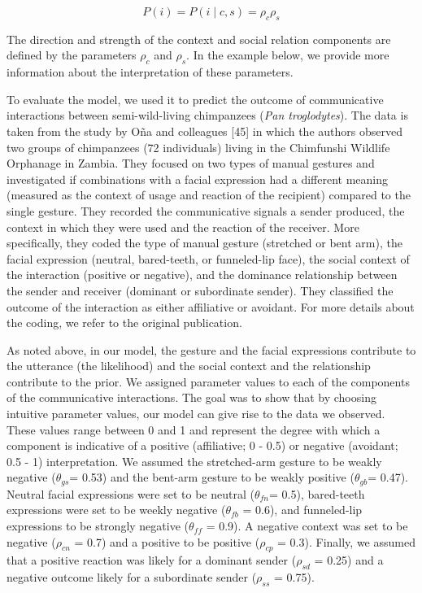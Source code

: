 \documentclass[
  english,
  man,floatsintext]{apa6}
\begin{document}
\begin{equation}
P(i)=P(i \mid c,s) = \rho_c \rho_s
\end{equation}

The direction and strength of the context and social relation components are defined by the parameters \(\rho_c\) and \(\rho_s\). In the example below, we provide more information about the interpretation of these parameters.

To evaluate the model, we used it to predict the outcome of communicative interactions between semi-wild-living chimpanzees (\emph{Pan troglodytes}). The data is taken from the study by Oña and colleagues {[}45{]} in which the authors observed two groups of chimpanzees (72 individuals) living in the Chimfunshi Wildlife Orphanage in Zambia. They focused on two types of manual gestures and investigated if combinations with a facial expression had a different meaning (measured as the context of usage and reaction of the recipient) compared to the single gesture. They recorded the communicative signals a sender produced, the context in which they were used and the reaction of the receiver. More specifically, they coded the type of manual gesture (stretched or bent arm), the facial expression (neutral, bared-teeth, or funneled-lip face), the social context of the interaction (positive or negative), and the dominance relationship between the sender and receiver (dominant or subordinate sender). They classified the outcome of the interaction as either affiliative or avoidant. For more details about the coding, we refer to the original publication.

As noted above, in our model, the gesture and the facial expressions contribute to the utterance (the likelihood) and the social context and the relationship contribute to the prior. We assigned parameter values to each of the components of the communicative interactions. The goal was to show that by choosing intuitive parameter values, our model can give rise to the data we observed. These values range between 0 and 1 and represent the degree with which a component is indicative of a positive (affiliative; 0 - 0.5) or negative (avoidant; 0.5 - 1) interpretation. We assumed the stretched-arm gesture to be weakly negative (\(\theta_{gs}\)= 0.53) and the bent-arm gesture to be weakly positive (\(\theta_{gb}\)= 0.47). Neutral facial expressions were set to be neutral (\(\theta_{fn}\)= 0.5), bared-teeth expressions were set to be weekly negative (\(\theta_{fb}\) = 0.6), and funneled-lip expressions to be strongly negative (\(\theta_{ff}\) = 0.9). A negative context was set to be negative (\(\rho_{cn}\) = 0.7) and a positive to be positive (\(\rho_{cp}\) = 0.3). Finally, we assumed that a positive reaction was likely for a dominant sender (\(\rho_{sd}\) = 0.25) and a negative outcome likely for a subordinate sender (\(\rho_{ss}\) = 0.75).
\end{document}
